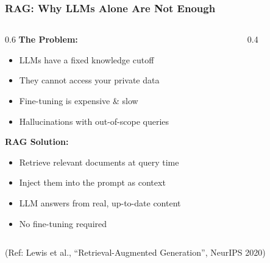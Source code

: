 \begin{frame}\frametitle{RAG: Why LLMs Alone Are Not Enough}

\begin{columns}
  \begin{column}{0.6\textwidth}
    \textbf{The Problem:}
    \begin{itemize}
    \item LLMs have a fixed knowledge cutoff
    \item They cannot access your private data
    \item Fine-tuning is expensive \& slow
    \item Hallucinations with out-of-scope queries
    \end{itemize}
    \vspace{0.4cm}
    \textbf{RAG Solution:}
    \begin{itemize}
    \item Retrieve relevant documents at query time
    \item Inject them into the prompt as context
    \item LLM answers from real, up-to-date content
    \item No fine-tuning required
    \end{itemize}
  \end{column}
  \begin{column}{0.4\textwidth}
    \begin{center}
    \vspace{0.4cm}
    \end{center}
  \end{column}
\end{columns}

{\tiny (Ref: Lewis et al., ``Retrieval-Augmented Generation'', NeurIPS 2020)}
\end{frame}



